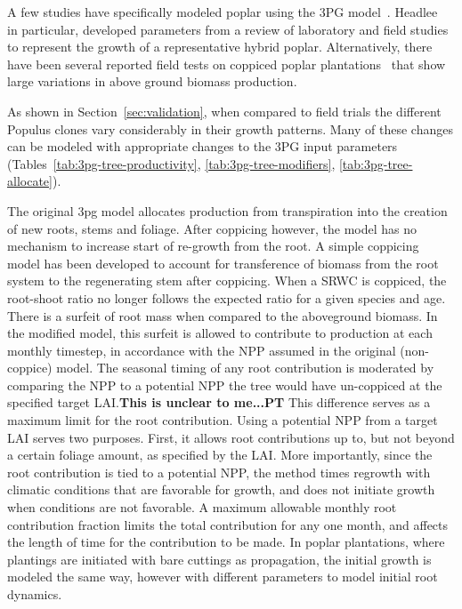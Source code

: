 \documentclass[preprint,12pt]{elsarticle}
\begin{document}
A few studies have specifically modeled poplar using the 3PG
model~\cite{Amichev2010,Headlee2012}. Headlee~\cite{Headlee2012} in
particular, developed parameters from a review of laboratory and field
studies to represent the growth of a representative hybrid poplar.
Alternatively, there have been several reported field tests on
coppiced poplar
plantations~\cite{Proe2002,Proe1999,Pontailler1999,Afas2008a} that
show large variations in above ground biomass production.

As shown in
Section~\ref{sec:validation}, when compared to field trials the different
Populus clones vary considerably in their growth patterns. Many of these changes
can be modeled with appropriate changes to the 3PG input parameters
(Tables~\ref{tab:3pg-tree-productivity}, \ref{tab:3pg-tree-modifiers},
\ref{tab:3pg-tree-allocate}).


The original \ac{3pg} model allocates production from transpiration
into the creation of new roots, stems and foliage.  After coppicing
however, the model has no mechanism to increase start of re-growth
from the root.  A simple coppicing model has been developed to account
for transference of biomass from the root system to the regenerating
stem after coppicing.  When a \ac{SRWC} is coppiced, the root-shoot
ratio no longer follows the expected ratio for a given species and
age. There is a surfeit of root mass when compared to the aboveground
biomass.  In the modified model, this surfeit is allowed to contribute
to production at each monthly timestep, in accordance with the
\ac{NPP} assumed in the original (non-coppice) model.  The seasonal
timing of any root contribution is moderated by comparing the \ac{NPP}
to a potential \ac{NPP} the tree would have un-coppiced at the
specified target \ac{LAI}.\textbf{This is unclear to me...PT} This
difference serves as a maximum limit for the root contribution.  Using
a potential \ac{NPP} from a target \ac{LAI} serves two
purposes. First, it allows root contributions up to, but not beyond a
certain foliage amount, as specified by the \ac{LAI}.  More
importantly, since the root contribution is tied to a potential
\ac{NPP}, the method times regrowth with climatic conditions that are
favorable for growth, and does not initiate growth when conditions are
not favorable.  A maximum allowable monthly root contribution fraction
limits the total contribution for any one month, and affects the
length of time for the contribution to be made.  In poplar
plantations, where plantings are initiated with bare cuttings as
propagation, the initial growth is modeled the same way, however with
different parameters to model initial root dynamics.
\end{document}

